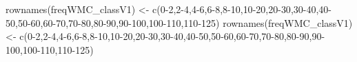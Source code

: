 \documentclass[
]{article}
\newenvironment{Shaded}{\begin{snugshade}}{\end{snugshade}}
\newcommand{\FunctionTok}[1]{\textcolor[rgb]{0.00,0.00,0.00}{#1}}
\newcommand{\NormalTok}[1]{#1}
\newcommand{\OtherTok}[1]{\textcolor[rgb]{0.56,0.35,0.01}{#1}}
\newcommand{\StringTok}[1]{\textcolor[rgb]{0.31,0.60,0.02}{#1}}
\begin{document}
\begin{Shaded}
\begin{Highlighting}[]
\FunctionTok{rownames}\NormalTok{(freqWMC\_classV1) }\OtherTok{\textless{}{-}} \FunctionTok{c}\NormalTok{(}\StringTok{\textquotesingle{}0{-}2\textquotesingle{}}\NormalTok{,}\StringTok{\textquotesingle{}2{-}4\textquotesingle{}}\NormalTok{,}\StringTok{\textquotesingle{}4{-}6\textquotesingle{}}\NormalTok{,}\StringTok{\textquotesingle{}6{-}8\textquotesingle{}}\NormalTok{,}\StringTok{\textquotesingle{}8{-}10\textquotesingle{}}\NormalTok{,}\StringTok{\textquotesingle{}10{-}20\textquotesingle{}}\NormalTok{,}\StringTok{\textquotesingle{}20{-}30\textquotesingle{}}\NormalTok{,}\StringTok{\textquotesingle{}30{-}40\textquotesingle{}}\NormalTok{,}\StringTok{\textquotesingle{}40{-}50\textquotesingle{}}\NormalTok{,}\StringTok{\textquotesingle{}50{-}60\textquotesingle{}}\NormalTok{,}\StringTok{\textquotesingle{}60{-}70\textquotesingle{}}\NormalTok{,}\StringTok{\textquotesingle{}70{-}80\textquotesingle{}}\NormalTok{,}\StringTok{\textquotesingle{}80{-}90\textquotesingle{}}\NormalTok{,}\StringTok{\textquotesingle{}90{-}100\textquotesingle{}}\NormalTok{,}\StringTok{\textquotesingle{}100{-}110\textquotesingle{}}\NormalTok{,}\StringTok{\textquotesingle{}110{-}125\textquotesingle{}}\NormalTok{)}
\FunctionTok{rownames}\NormalTok{(freqWMC\_classV1) }\OtherTok{\textless{}{-}} \FunctionTok{c}\NormalTok{(}\StringTok{\textquotesingle{}0{-}2\textquotesingle{}}\NormalTok{,}\StringTok{\textquotesingle{}2{-}4\textquotesingle{}}\NormalTok{,}\StringTok{\textquotesingle{}4{-}6\textquotesingle{}}\NormalTok{,}\StringTok{\textquotesingle{}6{-}8\textquotesingle{}}\NormalTok{,}\StringTok{\textquotesingle{}8{-}10\textquotesingle{}}\NormalTok{,}\StringTok{\textquotesingle{}10{-}20\textquotesingle{}}\NormalTok{,}\StringTok{\textquotesingle{}20{-}30\textquotesingle{}}\NormalTok{,}\StringTok{\textquotesingle{}30{-}40\textquotesingle{}}\NormalTok{,}\StringTok{\textquotesingle{}40{-}50\textquotesingle{}}\NormalTok{,}\StringTok{\textquotesingle{}50{-}60\textquotesingle{}}\NormalTok{,}\StringTok{\textquotesingle{}60{-}70\textquotesingle{}}\NormalTok{,}\StringTok{\textquotesingle{}70{-}80\textquotesingle{}}\NormalTok{,}\StringTok{\textquotesingle{}80{-}90\textquotesingle{}}\NormalTok{,}\StringTok{\textquotesingle{}90{-}100\textquotesingle{}}\NormalTok{,}\StringTok{\textquotesingle{}100{-}110\textquotesingle{}}\NormalTok{,}\StringTok{\textquotesingle{}110{-}125\textquotesingle{}}\NormalTok{)}

\end{Highlighting}
\end{Shaded}
\end{document}
